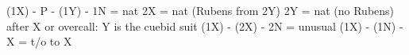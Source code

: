 (1X) - P - (1Y) -
    1N = nat
    2X = nat (Rubens from 2Y)
    2Y = nat (no Rubens)
    after X or overcall: Y is the cuebid suit
(1X) - (2X) - 2N = unusual
(1X) - (1N) - X = t/o to X